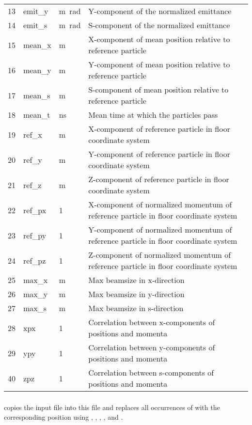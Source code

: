 \begin{center}
\begin{longtable}{p{1.2cm}p{1.9cm}p{1.3cm}p{9.5cm}}
13 & emit\_y & \si{\meter\radian} & Y-component of the normalized emittance\\
14 & emit\_s & \si{\meter\radian} & S-component of the normalized emittance\\
15 & mean\_x & \si{\meter} & X-component of mean position relative to reference particle\\
16 & mean\_y & \si{\meter} & Y-component of mean position relative to reference particle\\
17 & mean\_s & \si{\meter} & S-component of mean position relative to reference particle\\
18 & mean\_t & \si{\nano\second} & Mean time at which the particles pass\\
19 & ref\_x & \si{\meter} & X-component of reference particle in floor coordinate system\\
20 & ref\_y & \si{\meter} & Y-component of reference particle in floor coordinate system\\
21 & ref\_z & \si{\meter} & Z-component of reference particle in floor coordinate system\\
22 & ref\_px & 1 & X-component of normalized momentum of reference particle in floor coordinate system\\
23 & ref\_py & 1 & Y-component of normalized momentum of reference particle in floor coordinate system\\
24 & ref\_pz & 1 & Z-component of normalized momentum of reference particle in floor coordinate system\\
25 & max\_x & \si{\meter} & Max beamsize in x-direction\\
26 & max\_y & \si{\meter} & Max beamsize in y-direction\\
27 & max\_s & \si{\meter} & Max beamsize in s-direction\\
28 & xpx & 1 & Correlation between x-components of positions and momenta\\
29 & ypy & 1 & Correlation between y-components of positions and momenta\\
40 & zpz & 1 & Correlation between s-components of positions and momenta\\
\end{longtable}
\end{center}

\subsubsection*{}
\opalt copies the input file into this file and replaces all occurrences of  with the corresponding position using , , , ,  and .

